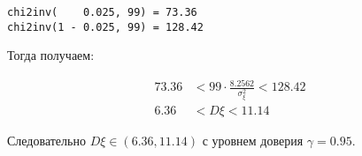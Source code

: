 \documentclass{report}
\begin{document}
\begin{lstlisting}
chi2inv(    0.025, 99) = 73.36
chi2inv(1 - 0.025, 99) = 128.42
\end{lstlisting}





Тогда получаем:

\begin{equation}
\begin{split}
73.36 & < 99 \cdot \frac{8.2562}{\sigma_\xi^2} < 128.42 \\
 6.36 & < D\xi                                 < 11.14
\end{split}
\end{equation}

Следовательно $D\xi \in \left ( 6.36, 11.14 \right )$ с уровнем доверия $\gamma = 0.95$.
\end{document}
